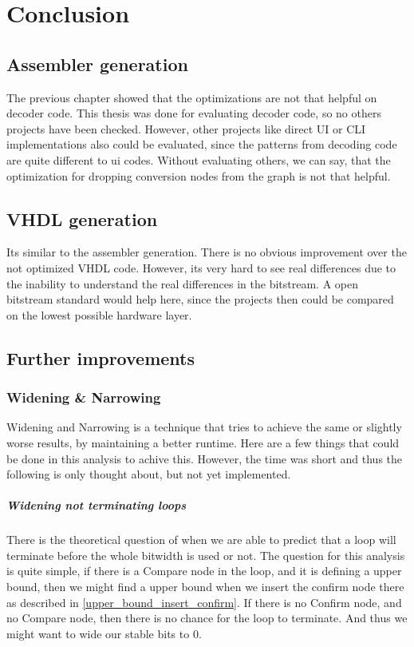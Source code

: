 \chapter{Conclusion}\label{sec:conclusion}

\section{Assembler generation}
The previous chapter showed that the optimizations are not that helpful on decoder code. This thesis was done for evaluating decoder code, so no others projects have been checked. However, other projects like direct UI or CLI implementations also could be evaluated, since the patterns from decoding code are quite different to ui codes. Without evaluating others, we can say, that the optimization for dropping conversion nodes from the graph is not that helpful.

\section{VHDL generation}
Its similar to the assembler generation. There is no obvious improvement over the not optimized VHDL code. However, its very hard to see real differences due to the inability to understand the real differences in the bitstream. A open bitstream standard would help here, since the projects then could be compared on the lowest possible hardware layer.
\section{Further improvements}
\subsection{Widening \& Narrowing}

Widening and Narrowing is a technique that tries to achieve the same or slightly worse results, by maintaining a better runtime. Here are a few things that could be done in this analysis to achive this. However, the time was short and thus the following is only thought about, but not yet implemented.

\paragraph{Widening not terminating loops}
There is the theoretical question of when we are able to predict that a loop will terminate before the whole bitwidth is used or not. The question for this analysis is quite simple, if there is a Compare node in the loop, and it is defining a upper bound, then we might find a upper bound when we insert the confirm node there as described in \ref{upper_bound_insert_confirm}. If there is no Confirm node, and no Compare node, then there is no chance for the loop to terminate. And thus we might want to wide our stable bits to 0.

